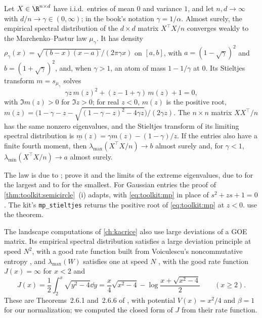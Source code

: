 \begin{refsection}
\begin{theorem}\label{thm:toolkit:mp}
Let $X\in\R^{n\times d}$ have i.i.d.\ entries of mean $0$ and variance $1$, and let $n,d\to\infty$ with $d/n\to\gamma\in(0,\infty)$; in the book's notation $\gamma=1/\alpha$. Almost surely, the empirical spectral distribution of the $d\times d$ matrix $X^\top X/n$ converges weakly to the Marchenko--Pastur law $\mu_\gamma$. It has density $\rho_\gamma(x)=\sqrt{(b-x)(x-a)}/(2\pi\gamma x)$ on $[a,b]$, with $a=(1-\sqrt\gamma)^2$ and $b=(1+\sqrt\gamma)^2$, and, when $\gamma>1$, an atom of mass $1-1/\gamma$ at $0$. Its Stieltjes transform $m=s_{\mu_\gamma}$ solves
\begin{equation}\label{eq:toolkit:mp}
\gamma z\,m(z)^2+(z-1+\gamma)\,m(z)+1=0,
\end{equation}
with $\Im m(z)>0$ for $\Im z>0$; for real $z<0$, $m(z)$ is the positive root, $m(z)=\bigl(1-\gamma-z-\sqrt{(1-\gamma-z)^2-4\gamma z}\bigr)/(2\gamma z)$. The $n\times n$ matrix $XX^\top/n$ has the same nonzero eigenvalues, and the Stieltjes transform of its limiting spectral distribution is $\underline m(z)=\gamma m(z)-(1-\gamma)/z$. If the entries also have a finite fourth moment, then $\lambda_{\max}(X^\top X/n)\to b$ almost surely and, for $\gamma<1$, $\lambda_{\min}(X^\top X/n)\to a$ almost surely.
\end{theorem}

The law is due to \textcite{MarchenkoPastur1967}; \textcite[Chapters~3 and~5]{BaiSilverstein2010} prove it and the limits of the extreme eigenvalues, due to \textcite{YinBaiKrishnaiah1988} for the largest and to \textcite{BaiYin1993} for the smallest. For Gaussian entries the proof of \cref{thm:toolkit:semicircle}~(i) adapts, with \eqref{eq:toolkit:mp} in place of $s^2+zs+1=0$. The kit's \texttt{mp\_\allowbreak stieltjes} returns the positive root of \eqref{eq:toolkit:mp} at $z<0$.  use the theorem.

\begin{remark}\label{rem:toolkit:goeldp}
The landscape computations of \cref{ch:kacrice} also use large deviations of a GOE matrix. Its empirical spectral distribution satisfies a large deviation principle at speed $N^2$, with a good rate function built from Voiculescu's noncommutative entropy \parencite{BenArousGuionnet1997b}, and $\lambda_{\max}(W)$ satisfies one at speed $N$ \parencite{BenArousDemboGuionnet2001}, with the good rate function $J(x)=\infty$ for $x<2$ and
\[
J(x)=\frac12\int_2^x\sqrt{y^2-4}\dd y=\frac x4\sqrt{x^2-4}-\log\frac{x+\sqrt{x^2-4}}2\qquad(x\ge2).
\]
These are Theorems~2.6.1 and~2.6.6 of \textcite{AndersonGuionnetZeitouni2010}, with potential $V(x)=x^2/4$ and $\beta=1$ for our normalization; we computed the closed form of $J$ from their rate function.
\end{remark}


\end{refsection}
